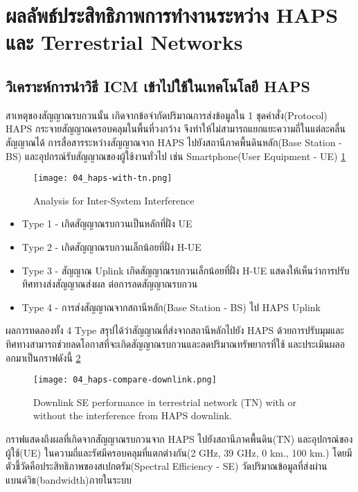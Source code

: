 \section{ผลลัพธ์ประสิทธิภาพการทำงานระหว่าง HAPS และ Terrestrial Networks}
\subsection{วิเคราะห์การนำวิธี ICM เข้าไปใช้ในเทคโนโลยี HAPS}

สาเหตุของสัญญาณรบกวนนั้น เกิดจากข้อจำกัดปริมาณการส่งข้อมูลใน 1 ชุดคำสั่ง(Protocol)
HAPS กระจายสัญญาณครอบคลุมในพื้นที่วงกว้าง จึงทำให้ไม่สามารถแยกแยะความถี่ในแต่ละคลื่นสัญญาณได้
การสื่อสารระหว่างสัญญาณจาก HAPS ไปยังสถานีภาคพื้นดินหลัก(Base Station - BS)
และอุปกรณ์รับสัญญาณของผู้ใช้งานทั่วไป เช่น Smartphone(User Equipment - UE) \ref{fig:04-haps-with-tn} 

\begin{figure}[h]
\centering
\caption[Interference Type]{Analysis for Inter-System Interference} 
\label{fig:04-haps-with-tn} 
\texttt{[image: 04\_haps-with-tn.png]}
\end{figure}

\begin{itemize}
    \item Type 1 - เกิดสัญญาณรบกวนเป็นหลักที่ฝั่ง UE
    \item Type 2 - เกิดสัญญาณรบกวนเล็กน้อยที่ฝั่ง H-UE
    \item Type 3 - สัญญาณ Uplink เกิดสัญญาณรบกวนเล็กน้อยที่ฝั่ง H-UE แสดงให้เห็นว่าการปรับทิศทางส่งสัญญาณส่งผล
    ต่อการลดสัญญาณรบกวน
    \item Type 4 - การส่งสัญญาณจากสถานีหลัก(Base Station - BS) ไป HAPS Uplink
\end{itemize}

ผลการทดลองทั้ง 4 Type สรุปได้ว่าสัญญาณที่ส่งจากสถานีหลักไปยัง HAPS ด้วยการปรับมุมและทิศทางสามารถช่วยลดโอกาสที่จะเกิดสัญญาณรบกวนและลดปริมาณทรัพยากรที่ใช้ และประเมินผลออกมาเป็นกราฟดังนี้
\ref{fig:04-haps-compare-downlink}

\begin{figure}[h]
\centering
\caption[HAPS compare with downlink]{Downlink SE performance in terrestrial network (TN) with or without
the interference from HAPS downlink.} 
\label{fig:04-haps-compare-downlink}
\texttt{[image: 04\_haps-compare-downlink.png]}
\end{figure}

กราฟแสดงถึงผลที่เกิดจากสัญญาณรบกวนจาก HAPS ไปยังสถานีภาคพื้นดิน(TN) และอุปกรณ์ของผู้ใช้(UE)
ในความถี่และรัศมีครอบคลุมที่แตกต่างกัน(2 GHz, 39 GHz, 0 km., 100 km.) โดยมีตัวชี้วัดคือประสิทธิภาพของสเปกตรัม(Spectral Efficiency - SE)
วัดปริมาณข้อมูลที่ส่งผ่านแบนด์วิธ(bandwidth)ภายในระบบ\\


